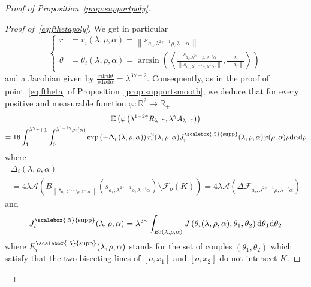 \documentclass[AHL,Unicode,longabstracts,published]{cedram}
\newcommand{\cA}{\mathcal{A}}
\newcommand{\cF}{\mathcal{F}}
\newcommand{\dd}{\mathrm{d}}
\newcommand{\E}{\mathbb{E}}
\newcommand{\R}{\mathbb{R}}
\DeclareMathOperator{\supp}{\scalebox{.5}{supp}}
\newcommand{\noi}{\noindent}
\newenvironment*{prooff}{\begin{proof}}{\let\qed\relax\end{proof}}
\newcommand{\R}{\mathbb{R}}
\begin{document}
\begin{proof}[{Proof of Proposition~\ref{prop:supportpoly}.}]
\begin{prooff}[{Proof of~\eqref{eq:fthetapoly}}]
We get in particular
\[
\begin{cases}
r & =  r_i(\lambda,\rho,\alpha)=\left\|s_{a_i,\lambda^{2\gamma-1}\rho,\lambda^{-\gamma}\alpha}\right\| \\
\theta & =  \theta_i(\lambda,\rho,\alpha) = \arcsin\left(\left\langle \frac{s_{a_i,\lambda^{2\gamma-1}\rho,\,\lambda^{-\gamma}\alpha}}{\bigl\|s_{a_i,\lambda^{2\gamma-1}\rho,\lambda^{-\gamma}\alpha}\bigr\|},\frac{o_i}{\|o_i\|}\right\rangle\right)
\end{cases}
\]
and a Jacobian given by $\tfrac{r\dd r \dd \theta }{\rho\dd\rho \dd\alpha} = \lambda^{3\gamma-2}$. Consequently, as in the proof of point~\eqref{eq:ftheta} of Proposition~\ref{prop:supportsmooth}, we deduce that for every positive and measurable function $\varphi:\R^2\longrightarrow \R_+$
\begin{multline*}
\E\left(\varphi\left(\lambda^{1-2\gamma}R_{\lambda^{-\gamma}}, \lambda^{\gamma}A_{\lambda^{-\gamma}}\right)\right) \\
= 16\int_1^{\lambda^{\gamma}\pi+1}\int_0^{\lambda^{1-2\gamma}\rho_i(\alpha)}\exp\left(-\Delta_i\left(\lambda,\rho,\alpha\right)\right)r_i^2(\lambda,\rho,\alpha) J^{\supp}_i(\lambda,\rho,\alpha)\varphi(\rho,\alpha)\rho\dd\alpha\dd \rho \\
\end{multline*}
where
\begin{multline*}
\Delta_i(\lambda,\rho,\alpha)\\
= 4\lambda\cA\left(B_{\left\|s_{a_i,\lambda^{2\gamma-1}\rho,\lambda^{-\gamma}\alpha}\right\|}\left(s_{a_i,\lambda^{2\gamma-1}\rho,\lambda^{-\gamma}\alpha}\right)\setminus \cF_o(K)\right) = 4\lambda\cA\left(\Delta \cF_{a_i,\lambda^{2\gamma-1}\rho,\lambda^{-\gamma}\alpha}\right)
\end{multline*}
and
\[
J^{\supp}_i(\lambda,\rho,\alpha)=\lambda^{3\gamma}\int_{E_i(\lambda,\rho,\alpha)} J\left(\theta_i(\lambda,\rho,\alpha),\theta_1,\theta_2\right)\dd \theta_1\dd \theta_2
\]
where $E_i^{\supp}(\lambda,\rho,\alpha)$ stands for the set of couples $(\theta_1,\theta_2)$ which satisfy that the two bisecting lines of $[o,x_1]$ and $[o,x_2]$ do not intersect $K$.


\end{prooff}
\end{proof}
\end{document}
